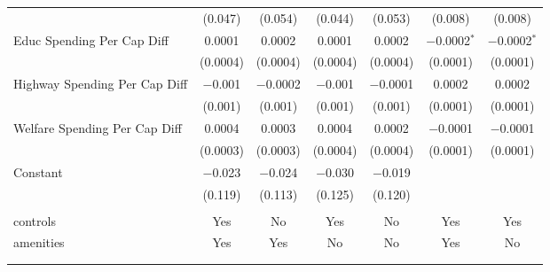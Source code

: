 \begin{table}[!htbp]
\begin{tabular}{@{\extracolsep{5pt}}lcccccc}
  & (0.047) & (0.054) & (0.044) & (0.053) & (0.008) & (0.008) \\ 
  Educ Spending Per Cap Diff & 0.0001 & 0.0002 & 0.0001 & 0.0002 & $-$0.0002$^{*}$ & $-$0.0002$^{*}$ \\ 
  & (0.0004) & (0.0004) & (0.0004) & (0.0004) & (0.0001) & (0.0001) \\ 
  Highway Spending Per Cap Diff & $-$0.001 & $-$0.0002 & $-$0.001 & $-$0.0001 & 0.0002 & 0.0002 \\ 
  & (0.001) & (0.001) & (0.001) & (0.001) & (0.0001) & (0.0001) \\ 
  Welfare Spending Per Cap Diff & 0.0004 & 0.0003 & 0.0004 & 0.0002 & $-$0.0001 & $-$0.0001 \\ 
  & (0.0003) & (0.0003) & (0.0004) & (0.0004) & (0.0001) & (0.0001) \\ 
  Constant & $-$0.023 & $-$0.024 & $-$0.030 & $-$0.019 &  &  \\ 
  & (0.119) & (0.113) & (0.125) & (0.120) &  &  \\ 
 \hline \\[-1.8ex] 
controls & Yes & No & Yes & No & Yes & Yes \\ 
amenities & Yes & Yes & No & No & Yes & No \\ 
\hline \\[-1.8ex] 
\hline 
\hline \\[-1.8ex] 
\end{tabular} 
\end{table} 
